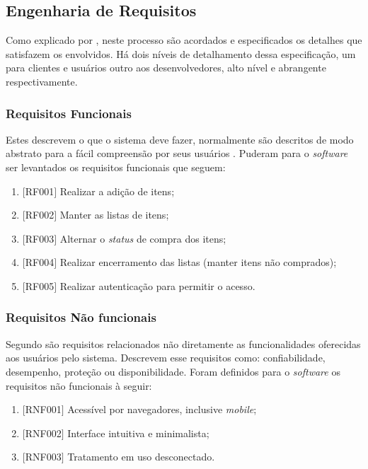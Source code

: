 \documentclass[
	12pt,
	openright,
	oneside, %
	a4paper,
	chapter=TITLE,
	section=TITLE,
	english,
	brazil %
	]{abntex2-udesc}
\begin{document}
\subsection{Engenharia de Requisitos}

Como explicado por , neste processo são acordados e especificados os detalhes que satisfazem os envolvidos. Há dois níveis de detalhamento dessa especificação, um para clientes e usuários outro aos desenvolvedores, alto nível e abrangente respectivamente.

\subsubsection{Requisitos Funcionais}

Estes descrevem o que o sistema deve fazer, normalmente são descritos de modo abstrato para a fácil compreensão por seus usuários \cite{sommerville2011}. Puderam para o \textit{software} ser levantados os requisitos funcionais que seguem:
\begin{enumerate}
\item $[$RF001$]$ Realizar a adição de itens;
\item $[$RF002$]$ Manter as listas de itens;
\item $[$RF003$]$ Alternar o \textit{status} de compra dos itens;
\item $[$RF004$]$ Realizar encerramento das listas (manter itens não comprados);
\item $[$RF005$]$ Realizar autenticação para permitir o acesso.
\end{enumerate}

\subsubsection{Requisitos Não funcionais}


Segundo  são requisitos relacionados não diretamente as funcionalidades oferecidas aos usuários pelo sistema. Descrevem esse requisitos como: confiabilidade, desempenho, proteção ou disponibilidade.
Foram definidos para o \textit{software}  os requisitos não funcionais à seguir:
\begin{enumerate}
\item $[$RNF001$]$ Acessível por navegadores, inclusive \textit{mobile};
\item $[$RNF002$]$ Interface intuitiva e minimalista;
\item $[$RNF003$]$ Tratamento em uso desconectado.
\end{enumerate}
\end{document}
